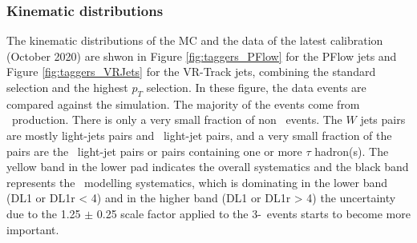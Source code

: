 \documentclass[letterpaper,12pt]{article}
\begin{document}
\subsubsection{Kinematic distributions}
The kinematic distributions of the MC and the data of the latest calibration 
(October 2020) are shwon in Figure \ref{fig:taggers_PFlow} for the PFlow jets and 
Figure \ref{fig:taggers_VRJets} for the VR-Track jets, 
combining the standard selection and the highest $p_T$ selection. 
In these figure, the data events are compared against the simulation.
The majority of the events come from \ttbar\ production. There is only
a very small fraction of non \ttbar\ events. The $W$ jets pairs are mostly light-jets 
pairs and \cjet\ light-jet pairs, and a very small fraction of the pairs are the 
\bjet\ light-jet pairs or pairs containing one or more $\tau$ hadron(s). 
The yellow band in the lower pad indicates the overall systematics and the 
black band represents the \ttbar\ modelling systematics, which is dominating 
in the lower band (DL1 or DL1r < 4) and in the higher band (DL1 or DL1r > 4) the
uncertainty due to the 1.25 $\pm$ 0.25 scale factor applied to the 3-\bjet\ events 
starts to become more important. 
\end{document}
